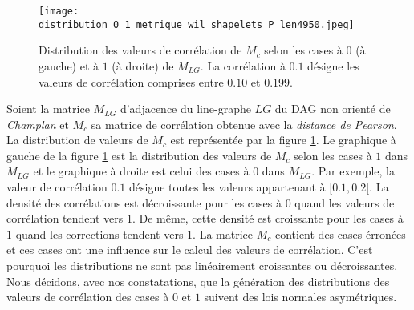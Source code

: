 \begin{figure}[htb!] 
\centering
\texttt{[image: distribution\_0\_1\_metrique\_wil\_shapelets\_P\_len4950.jpeg]}
\caption{ Distribution des valeurs de corr\'elation de $M_c$ selon les cases \`a $0$ (\`a gauche) et \`a $1$ (\`a droite) de $M_{LG}$. La corr\'elation \`a $0.1$ d\'esigne  les valeurs de corr\'elation comprises entre $0.10$ et $0.199$. }
\label{distribution_0_1_metrique_wil_shapelets_P_len4950} 
\end{figure}


Soient la matrice $M_{LG}$ d'adjacence du line-graphe $LG$ du DAG non orient\'e de {\em Champlan} et $M_c$ sa matrice de corr\'elation obtenue avec la {\em distance de Pearson}.
 La distribution de valeurs de $M_c$ est repr\'esent\'ee par la figure \ref{distribution_0_1_metrique_wil_shapelets_P_len4950}. Le graphique \`a gauche de la figure \ref{distribution_0_1_metrique_wil_shapelets_P_len4950}  est la distribution des valeurs de $M_c$ selon les cases \`a $1$ dans $M_{LG}$ et le graphique \`a droite est celui des cases \`a $0$ dans $M_{LG}$. 
 Par exemple, la valeur de corr\'elation $0.1$ d\'esigne toutes les valeurs appartenant \`a $[0.1, 0.2[$. 
\newline
La densit\'e des  corr\'elations est d\'ecroissante pour les cases \`a $0$ quand les valeurs de corr\'elation tendent vers $1$. De m\^eme, cette densit\'e est croissante pour les cases \`a $1$ quand les corrections tendent vers $1$. La matrice $M_c$ contient des cases \'erron\'ees et ces cases ont une influence sur le calcul des valeurs de corr\'elation. C'est pourquoi les distributions ne sont pas lin\'eairement croissantes ou d\'ecroissantes.
Nous d\'ecidons, avec nos constatations, que la g\'en\'eration des distributions des valeurs de corr\'elation des cases \`a $0$ et $1$ suivent des lois normales asym\'etriques.
\newline

